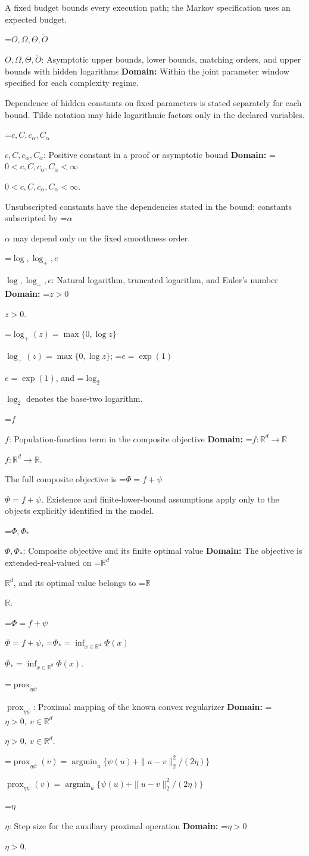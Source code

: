 \documentclass[10pt,a4paper]{article}
\newcommand{\AtlasMath}[1]{\par\begingroup\centering\setbox0=\hbox{$\displaystyle #1$}\ifdim\wd0>1.4\linewidth\typeout{ATLAS WIDE FORMULA: \the\wd0}\fi\ifdim\wd0>\linewidth\resizebox{\linewidth}{!}{\box0}\else\box0\fi\par\endgroup}
\newcommand{\AtlasInlineMath}[1]{\begingroup\setbox0=\hbox{$#1$}\ifdim\wd0>.4\linewidth\endgroup\AtlasMath{#1}\else\endgroup$#1$\fi}
\begin{document}
A fixed budget bounds every execution path; the Markov specification uses an expected budget.

\AtlasInlineMath{O,\Omega,\Theta,\widetilde{O}}: Asymptotic upper bounds, lower bounds, matching orders, and upper bounds with hidden logarithms \textbf{Domain:} Within the joint parameter window specified for each complexity regime.

Dependence of hidden constants on fixed parameters is stated separately for each bound. Tilde notation may hide logarithmic factors only in the declared variables.

\AtlasInlineMath{c,C,c_\alpha,C_\alpha}: Positive constant in a proof or asymptotic bound \textbf{Domain:} \AtlasInlineMath{0<c,C,c_\alpha,C_\alpha<\infty}.

Unsubscripted constants have the dependencies stated in the bound; constants subscripted by \AtlasInlineMath{\alpha} may depend only on the fixed smoothness order.

\AtlasInlineMath{\log,\log_+,e}: Natural logarithm, truncated logarithm, and Euler's number \textbf{Domain:} \AtlasInlineMath{z>0}.

\AtlasInlineMath{\log_+(z)=\max\{0,\log z\}}; \AtlasInlineMath{e=\exp(1)}, and \AtlasInlineMath{\log_2} denotes the base-two logarithm.

\AtlasInlineMath{f}: Population-function term in the composite objective \textbf{Domain:} \AtlasInlineMath{f:\mathbb{R}^d\to\mathbb{R}}.

The full composite objective is \AtlasInlineMath{\Phi=f+\psi}. Existence and finite-lower-bound assumptions apply only to the objects explicitly identified in the model.

\AtlasInlineMath{\Phi,\Phi_*}: Composite objective and its finite optimal value \textbf{Domain:} The objective is extended-real-valued on \AtlasInlineMath{\mathbb{R}^d}, and its optimal value belongs to \AtlasInlineMath{\mathbb{R}}.

\AtlasInlineMath{\Phi=f+\psi}, \AtlasInlineMath{\Phi_*=\inf_{x\in\mathbb{R}^d}\Phi(x)}.

\AtlasInlineMath{\operatorname{prox}_{\eta\psi}}: Proximal mapping of the known convex regularizer \textbf{Domain:} \AtlasInlineMath{\eta>0,\ v\in\mathbb{R}^d}.

\AtlasInlineMath{\operatorname{prox}_{\eta\psi}(v)=\operatorname{argmin}_u\{\psi(u)+\|u-v\|_2^2/(2\eta)\}}

\AtlasInlineMath{\eta}: Step size for the auxiliary proximal operation \textbf{Domain:} \AtlasInlineMath{\eta>0}.
\end{document}

